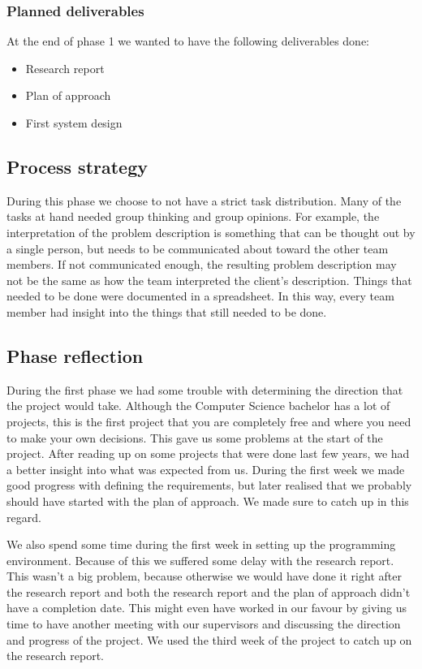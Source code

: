 \subsubsection{Planned deliverables}
At the end of phase 1 we wanted to have the following deliverables done:
\begin{itemize}
\item Research report
\item Plan of approach
\item First system design
\end{itemize}

\subsection{Process strategy}
During this phase we choose to not have a strict task distribution.
Many of the tasks at hand needed group thinking and group opinions.
For example, the interpretation of the problem description is something that can be thought out by a single person, but needs to be communicated about toward the other team members.
If not communicated enough, the resulting problem description may not be the same as how the team interpreted the client's description.
Things that needed to be done were documented in a spreadsheet.
In this way, every team member had insight into the things that still needed to be done.

\subsection{Phase reflection}
During the first phase we had some trouble with determining the direction that the project would take.
Although the Computer Science bachelor has a lot of projects, this is the first project that you are completely free and where you need to make your own decisions. 
This gave us some problems at the start of the project.
After reading up on some projects that were done last few years, we had a better insight into what was expected from us.
During the first week we made good progress with defining the requirements, but later realised that we probably should have started with the plan of approach.
We made sure to catch up in this regard.

We also spend some time during the first week in setting up the programming environment.
Because of this we suffered some delay with the research report.
This wasn't a big problem, because otherwise we would have done it right after the research report and both the research report and the plan of approach didn't have a completion date.
This might even have worked in our favour by giving us time to have another meeting with our supervisors and discussing the direction and progress of the project.
We used the third week of the project to catch up on the research report.

